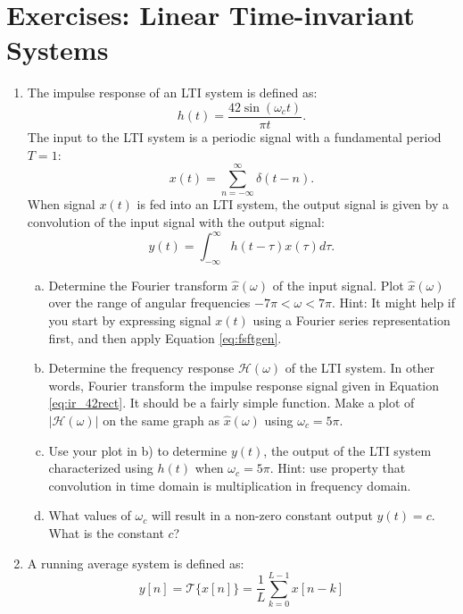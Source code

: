 \newpage
\section*{Exercises: Linear Time-invariant Systems}
\begin{enumerate}
\item The impulse response of an LTI system is defined as:
\begin{equation}
    h(t) = \frac{42\sin(\omega_c t)}{\pi t}.
    \label{eq:ir_42rect}
\end{equation}
The input to the LTI system is a periodic signal with a fundamental period $T=1$:
\begin{equation}
    x(t) = \sum_{n=-\infty}^{\infty}\delta(t-n).
\end{equation}
When signal $x(t)$ is fed into an LTI system, the output signal is given by a convolution of the input signal with the output signal:
\begin{equation}
    y(t) = \int_{-\infty}^{\infty} h(t-\tau)x(\tau) d\tau.
\end{equation}
\begin{enumerate}[a)]
\item Determine the Fourier transform $\hat{x}(\omega)$ of the input signal. Plot $\hat{x}(\omega)$ over the range of angular frequencies $-7\pi < \omega < 7\pi$. Hint: It might help if you start by expressing signal $x(t)$ using a Fourier series representation first, and then apply Equation \ref{eq:fsftgen}.
\item Determine the frequency response $\mathcal{H}(\omega)$ of the LTI system. In other words, Fourier transform the impulse response signal given in Equation \ref{eq:ir_42rect}. It should be a fairly simple function. Make a plot of $|\mathcal{H}(\omega)|$ on the same graph as $\hat{x}(\omega)$ using $\omega_c = 5\pi$.
\item Use your plot in b) to determine $y(t)$, the output of the LTI system characterized using $h(t)$ when $\omega_c=5\pi$. Hint: use property that convolution in time domain is multiplication in frequency domain.
\item What values of $\omega_c$ will result in a non-zero constant output $y(t)=c$. What is the constant $c$?
\end{enumerate}

\item A running average system is defined as:
  \begin{equation}
    y[n] = \mathcal{T}\{x[n]\} = \frac{1}{L}\sum_{k=0}^{L-1} x[n-k]
  \end{equation}


\end{enumerate}
